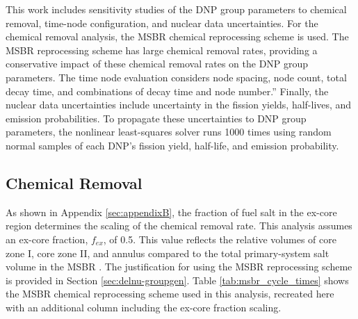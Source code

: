 
This work includes sensitivity studies of the \gls{DNP} group parameters to chemical removal, time-node configuration, and nuclear data uncertainties.
For the chemical removal analysis, the \gls{MSBR} chemical reprocessing scheme is used.
The \gls{MSBR} reprocessing scheme has large chemical removal rates, providing a conservative impact of these chemical removal rates on the \gls{DNP} group parameters.
The time node evaluation considers node spacing, node count, total decay time, and combinations of decay time and node number.”
Finally, the nuclear data uncertainties include uncertainty in the fission yields, half-lives, and emission probabilities.
To propagate these uncertainties to \gls{DNP} group parameters, the nonlinear least-squares solver runs 1000 times using random normal samples of each \gls{DNP}’s fission yield, half-life, and emission probability.

\subsection{Chemical Removal}
\label{sec:chemrem-msbr}
As shown in Appendix \ref{sec:appendixB}, the fraction of fuel salt in the ex-core region determines the scaling of the chemical removal rate.
This analysis assumes an ex-core fraction, $f_{ex}$, of 0.5.
This value reflects the relative volumes of core zone I, core zone II, and annulus compared to the total primary-system salt volume in the \gls{MSBR} \cite{robertson_conceptual_1971}.
The justification for using the \gls{MSBR} reprocessing scheme is provided in Section \ref{sec:delnu-groupgen}.
Table \ref{tab:msbr_cycle_times} shows the \gls{MSBR} chemical reprocessing scheme used in this analysis, recreated here with an additional column including the ex-core fraction scaling.

